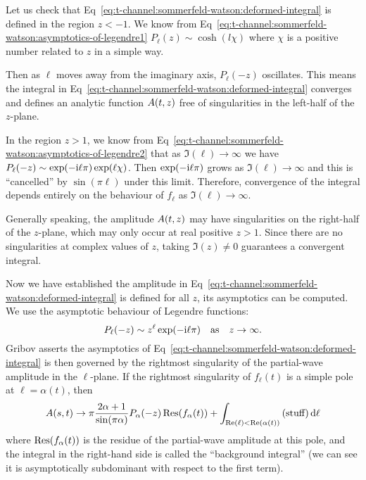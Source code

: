 Let us check that Eq~\eqref{eq:t-channel:sommerfeld-watson:deformed-integral}
is defined in the region $z<-1$. We know from Eq~\eqref{eq:t-channel:sommerfeld-watson:asymptotics-of-legendre1} $P_{\ell}(z)\sim\cosh(l\chi)$
where $\chi$ is a positive number related to $z$ in a simple way.

Then as $\ell$ moves away from the imaginary axis, $P_{\ell}(-z)$
oscillates. This means the integral in Eq~\eqref{eq:t-channel:sommerfeld-watson:deformed-integral}
converges and defines an analytic function $A(t,z)$ free of
singularities in the left-half of the $z$-plane.

In the region $z > 1$, we know from Eq~\eqref{eq:t-channel:sommerfeld-watson:asymptotics-of-legendre2}
that as $\Im(\ell)\to\infty$ we have $P_{\ell}(-z)\sim\exp(-\mathrm{i}\ell\pi)\exp(\ell\chi)$.
Then $\exp(-\mathrm{i}\ell\pi)$ grows as $\Im(\ell)\to\infty$ and this is
``cancelled'' by $\sin(\pi\ell)$ under this limit. Therefore,
convergence of the integral depends entirely on the behaviour of
$f_{\ell}$ as $\Im(\ell)\to\infty$. 

Generally speaking, the amplitude $A(t,z)$ may have
singularities on the right-half of the $z$-plane, which may only occur
at real positive $z>1$. Since there are no singularities at complex
values of $z$, taking $\Im(z)\neq0$ guarantees a convergent integral.

Now we have established the amplitude in Eq~\eqref{eq:t-channel:sommerfeld-watson:deformed-integral}
is defined for all $z$, its asymptotics can be computed. We use the
asymptotic behaviour of Legendre functions:
\begin{equation}
P_{\ell}(-z)\sim z^{\ell}\exp(-\mathrm{i}\ell\pi)\quad\mbox{as}\quad z\to\infty.
\end{equation}
Gribov asserts the asymptotics of Eq~\eqref{eq:t-channel:sommerfeld-watson:deformed-integral}
is then governed by the rightmost singularity of the partial-wave
amplitude in the $\ell$-plane. If the rightmost singularity of
$f_{\ell}(t)$ is a simple pole at $\ell=\alpha(t)$, then
\begin{equation}
A(s,t)\to\pi\frac{2\alpha+1}{\sin(\pi\alpha)}P_{\alpha}(-z)\operatorname{Res}(f_{\alpha}(t))+\int_{\operatorname{Re}(\ell)<\operatorname{Re}(\alpha(t))}\mbox{(stuff)}\,\mathrm{d}\ell
\end{equation}
where $\operatorname{Res}(f_{\alpha}(t))$ is the residue of the partial-wave amplitude
at this pole, and the integral in the right-hand side is called the ``background
integral'' (we can see it is asymptotically subdominant with respect to
the first term).

